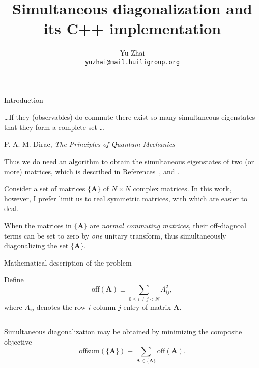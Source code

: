 \documentclass[aspectratio=169,10pt]{beamer}
\title[Simultaneous diagonalization]{Simultaneous diagonalization and its C++ implementation}
\author{Yu Zhai \\
	\texttt{yuzhai@mail.huiligroup.org}}
\institute[ITC@JLU]{Institute of Theoretical Chemistry, Jilin University, Changchun, China. }
\begin{document}
  
    	\begin{frame}
    \maketitle
    \end{frame}


\begin{frame}{Introduction}

    \begin{block}{}
\ldots If they (observables) do commute there exist so
many simultaneous eigenstates that they form a complete set \ldots

\flushright
P. A. M. Dirac, \textit{The Principles of Quantum Mechanics}
    \end{block}

Thus we do need an
algorithm to obtain the simultaneous eigenstates of two (or more)
matrices, 
which is described in References~\cite{Dawes2004}, \cite{BunseGerstner1993} and \cite{Cardoso1996}.

    Consider a set of matrices $\{\mathbf{A}\}$ of $N\times N$ complex matrices.
In this work, however, I prefer limit us to real symmetric matrices, 
with which are easier to deal.

When the matrices in $\{\mathbf{A}\}$ are \emph{normal commuting
	matrices}, their off-diagnoal terms can be set to zero by \emph{one} unitary
transform, thus simultaneously diagonalizing the set $\{\mathbf{A}\}$.

\end{frame}


\begin{frame}[allowframebreaks]{Mathematical description of the problem}

    Define 
\begin{equation}
\mathrm{off}(\mathbf{A})\equiv\sum_{0 \leq i \ne j < N}A_{ij}^2,
\end{equation}
where $A_{ij}$ denotes the row $i$ column $j$ entry of matrix $\mathbf{A}$.

\inputminted[linenos,firstline=21, lastline=29, breaklines]{cpp}{../simultaneousDiagonalization.cc}
   
   \framebreak
   
   
    Simultaneous diagonalization may be obtained by minimizing the composite
objective
\begin{equation}
\mathrm{offsum}(\{\mathbf{A}\})\equiv\sum_{\mathbf{A}\in \{\mathbf{A}\}}\mathrm{off}(\mathbf{A}).
\end{equation}

\inputminted[linenos,firstline=31, lastline=37, breaklines]{cpp}{../simultaneousDiagonalization.cc}

\end{frame}
         
\end{document}
